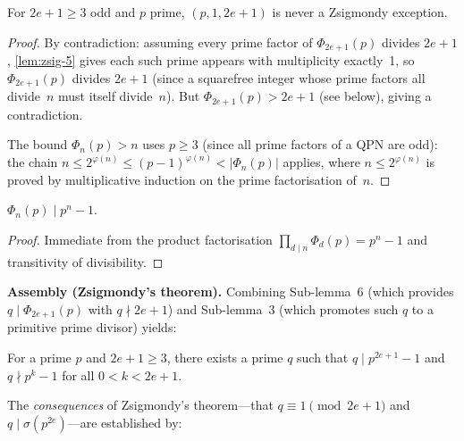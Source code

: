 \begin{lemma}\label{lem:zsig-6}
For $2e+1 \ge 3$ odd and $p$ prime, $(p, 1, 2e+1)$ is never
a Zsigmondy exception.
\end{lemma}
\begin{proof}
By contradiction: assuming every
prime factor of $\Phi_{2e+1}(p)$ divides $2e+1$, \cref{lem:zsig-5} gives
each such prime appears with multiplicity exactly~1, so
$\Phi_{2e+1}(p)$ divides $2e+1$ (since a squarefree integer whose
prime factors all divide~$n$ must itself divide~$n$).  But
$\Phi_{2e+1}(p) > 2e+1$ (see below), giving a contradiction.

The bound $\Phi_n(p) > n$ uses $p \ge 3$ (since all prime factors of a QPN are odd):
the chain $n \le 2^{\varphi(n)} \le (p-1)^{\varphi(n)} < |\Phi_n(p)|$
applies, where $n \le 2^{\varphi(n)}$ is proved by multiplicative induction
on the prime factorisation of~$n$.
\end{proof}

\begin{lemma}\label{lem:zsig-7}
$\Phi_n(p) \mid p^n - 1$.
\end{lemma}
\begin{proof}
Immediate from the product factorisation
$\prod_{d \mid n} \Phi_d(p) = p^n - 1$ and transitivity of divisibility.
\end{proof}

\smallskip\noindent\textbf{Assembly (Zsigmondy's theorem).}
Combining Sub-lemma~6 (which provides $q \mid \Phi_{2e+1}(p)$ with
$q \nmid 2e+1$) and Sub-lemma~3 (which promotes such $q$ to a
primitive prime divisor) yields:

\begin{lemma}\label{lem:zsigmondy-exist}
For a prime $p$ and $2e+1 \ge 3$, there exists a prime $q$ such that
$q \mid p^{2e+1}-1$ and $q \nmid p^k - 1$ for all $0 < k < 2e+1$.
\end{lemma}

The \emph{consequences} of Zsigmondy's theorem---that $q \equiv 1 \pmod{2e+1}$ and
$q \mid \sigma(p^{2e})$---are established by:


